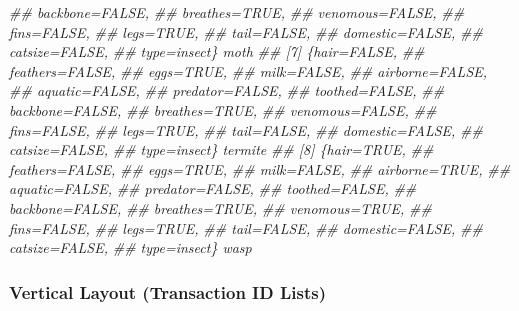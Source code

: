 \documentclass[
  notitlepage]{book}
\newenvironment{Shaded}{\begin{snugshade}}{\end{snugshade}}
\newcommand{\CommentTok}[1]{\textcolor[rgb]{0.56,0.35,0.01}{\textit{#1}}}
\begin{document}
\begin{Shaded}
\begin{Highlighting}[]
\CommentTok{\#\#      backbone=FALSE,               }
\CommentTok{\#\#      breathes=TRUE,                }
\CommentTok{\#\#      venomous=FALSE,               }
\CommentTok{\#\#      fins=FALSE,                   }
\CommentTok{\#\#      legs=TRUE,                    }
\CommentTok{\#\#      tail=FALSE,                   }
\CommentTok{\#\#      domestic=FALSE,               }
\CommentTok{\#\#      catsize=FALSE,                }
\CommentTok{\#\#      type=insect\}          moth    }
\CommentTok{\#\# [7] \{hair=FALSE,                   }
\CommentTok{\#\#      feathers=FALSE,               }
\CommentTok{\#\#      eggs=TRUE,                    }
\CommentTok{\#\#      milk=FALSE,                   }
\CommentTok{\#\#      airborne=FALSE,               }
\CommentTok{\#\#      aquatic=FALSE,                }
\CommentTok{\#\#      predator=FALSE,               }
\CommentTok{\#\#      toothed=FALSE,                }
\CommentTok{\#\#      backbone=FALSE,               }
\CommentTok{\#\#      breathes=TRUE,                }
\CommentTok{\#\#      venomous=FALSE,               }
\CommentTok{\#\#      fins=FALSE,                   }
\CommentTok{\#\#      legs=TRUE,                    }
\CommentTok{\#\#      tail=FALSE,                   }
\CommentTok{\#\#      domestic=FALSE,               }
\CommentTok{\#\#      catsize=FALSE,                }
\CommentTok{\#\#      type=insect\}          termite }
\CommentTok{\#\# [8] \{hair=TRUE,                    }
\CommentTok{\#\#      feathers=FALSE,               }
\CommentTok{\#\#      eggs=TRUE,                    }
\CommentTok{\#\#      milk=FALSE,                   }
\CommentTok{\#\#      airborne=TRUE,                }
\CommentTok{\#\#      aquatic=FALSE,                }
\CommentTok{\#\#      predator=FALSE,               }
\CommentTok{\#\#      toothed=FALSE,                }
\CommentTok{\#\#      backbone=FALSE,               }
\CommentTok{\#\#      breathes=TRUE,                }
\CommentTok{\#\#      venomous=TRUE,                }
\CommentTok{\#\#      fins=FALSE,                   }
\CommentTok{\#\#      legs=TRUE,                    }
\CommentTok{\#\#      tail=FALSE,                   }
\CommentTok{\#\#      domestic=FALSE,               }
\CommentTok{\#\#      catsize=FALSE,                }
\CommentTok{\#\#      type=insect\}          wasp}
\end{Highlighting}
\end{Shaded}

\hypertarget{vertical-layout-transaction-id-lists}{%
\subsubsection{Vertical Layout (Transaction ID Lists)}\label{vertical-layout-transaction-id-lists}}
\end{document}
